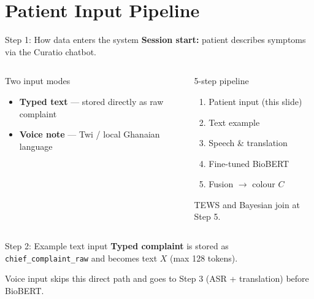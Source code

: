 \section{Patient Input Pipeline}

\begin{frame}{Step 1: How data enters the system}
  \textbf{Session start:} patient describes symptoms via the Curatio chatbot.

  \vspace{0.3em}
  \begin{columns}[T]
    \begin{block}{Two input modes}
      \begin{itemize}
        \item \textbf{Typed text} --- stored directly as raw complaint
        \item \textbf{Voice note} --- Twi / local Ghanaian language
      \end{itemize}
    \end{block}

    \begin{block}{5-step pipeline}
      \footnotesize
      \begin{enumerate}
        \item Patient input (this slide)
        \item Text example
        \item Speech \& translation
        \item Fine-tuned BioBERT
        \item Fusion $\to$ colour $C$
      \end{enumerate}
      \normalsize
      TEWS and Bayesian join at Step 5.
    \end{block}
  \end{columns}

\end{frame}

\begin{frame}{Step 2: Example text input}
  \textbf{Typed complaint} is stored as \texttt{chief\_complaint\_raw} and becomes text $X$ (max 128 tokens).


  \vspace{0.3em}
  Voice input skips this direct path and goes to Step 3 (ASR + translation) before BioBERT.

\end{frame}

